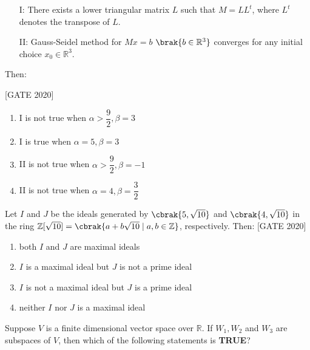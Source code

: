     \begin{enumerate}
        \item[I:] There exists a lower triangular matrix $ L $ such that $ M = L L^t $, where $ L^t $ denotes the transpose of $ L $.
        \item[II:] Gauss-Seidel method for $ Mx = b $ $\brak{ b \in \mathbb{R}^3 }$ converges for any initial choice $ x_0 \in \mathbb{R}^3 $.
    \end{enumerate}
    Then:
    
    \hfill{[GATE 2020]}
    \begin{multicols}{2}
    \begin{enumerate}
        \item I is not true when $ \alpha > \dfrac{9}{2}, \beta = 3 $
        
        \item I is true when $ \alpha = 5, \beta = 3 $
        \item II is not true when $ \alpha > \dfrac{9}{2}, \beta = -1 $
        \item II is not true when $ \alpha = 4, \beta = \dfrac{3}{2} $
        
    \end{enumerate}
    \end{multicols}

    \item    Let $ I $ and $ J $ be the ideals generated by $ \cbrak{5, \sqrt{10}} $ and $ \cbrak{4, \sqrt{10}} $ in the ring $ \mathbb{Z}[\sqrt{10}] = \cbrak{a + b\sqrt{10} \mid a, b \in \mathbb{Z}} $, respectively. Then:
        \hfill{[GATE 2020]}\begin{multicols}{2}\begin{enumerate}
        \item both $ I $ and $ J $ are maximal ideals
        \item $ I $ is a maximal ideal but $ J $ is not a prime ideal
        \item $ I $ is not a maximal ideal but $ J $ is a prime ideal
        \item neither $ I $ nor $ J $ is a maximal ideal
    \end{enumerate}\end{multicols}
   

    \item   Suppose $ V $ is a finite dimensional vector space over $ \mathbb{R} $. If $ W_1, W_2 $ and $ W_3 $ are subspaces of $ V $, then which of the following statements is \textbf{TRUE}?
   
